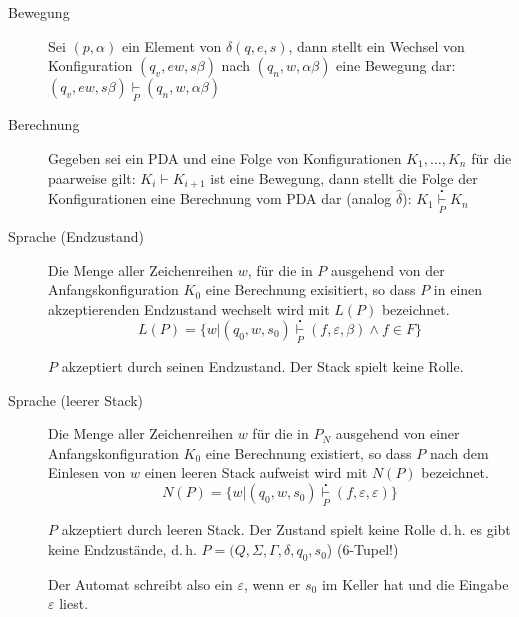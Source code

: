 \begin{description}
	\item[Bewegung]
	Sei $(p, \alpha)$ ein Element von $\delta(q, e, s)$, dann stellt ein Wechsel von Konfiguration $(q_v, ew, s\beta)$ nach $(q_n, w, \alpha\beta)$ eine Bewegung dar: $(q_v, ew, s\beta) \underset{P}{\vdash} (q_n, w, \alpha\beta)$

	\item[Berechnung]
	Gegeben sei ein PDA und eine Folge von Konfigurationen $K_1, \dots, K_n$ für die paarweise gilt: $K_i \vdash K_{i+1}$ ist eine Bewegung, dann stellt die Folge der Konfigurationen eine Berechnung vom PDA dar (analog $\hat{\delta}$): $K_1 \overset{\centerdot}{\underset{P}{\vdash}} K_n$

	\item[Sprache (Endzustand)] 
	Die Menge aller Zeichenreihen $w$, für die in $P$ ausgehend von der Anfangskonfiguration $K_0$ eine Berechnung exisitiert, so dass $P$ in einen akzeptierenden Endzustand wechselt wird mit $L(P)$ bezeichnet.
	\begin{equation*}
		L(P) = \{w | (q_0, w, s_0) \overset{\centerdot}{\underset{P}{\vdash}} (f, \varepsilon, \beta) \wedge f \in F\}
	\end{equation*}
	
	$P$ akzeptiert durch seinen Endzustand. Der Stack spielt keine Rolle.

	\item[Sprache (leerer Stack)] Die Menge aller Zeichenreihen $w$ für die in $P_N$ ausgehend von einer Anfangskonfiguration $K_0$ eine Berechnung existiert, so dass $P$ nach dem Einlesen von $w$ einen leeren Stack aufweist wird mit $N(P)$ bezeichnet.
	\begin{equation*}
		N(P) = \{w | (q_0, w, s_0) \overset{\centerdot}{\underset{P}{\vdash}} (f, \varepsilon, \varepsilon)\}
	\end{equation*}

	$P$ akzeptiert durch leeren Stack. Der Zustand spielt keine Rolle d.\,h. es gibt keine Endzustände, d.\,h. $P = (Q, \Sigma, \Gamma, \delta, q_0, s_0$) (6-Tupel!)

	Der Automat schreibt also ein $\varepsilon$, wenn er $s_0$ im Keller hat und die Eingabe $\varepsilon$ liest.

\end{description}

